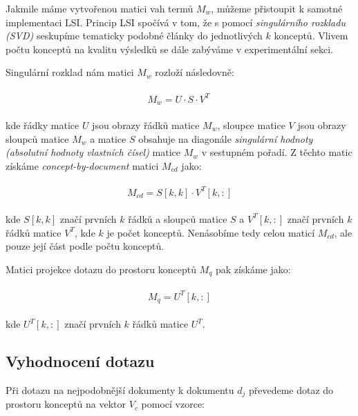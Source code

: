 \documentclass[11pt]{scrartcl} %
\begin{document}
Jakmile máme vytvořenou matici vah termů $M_w$, můžeme přistoupit k samotné implementaci LSI. Princip LSI spočívá v tom, že s pomocí \emph{singulárního rozkladu (SVD)} seskupíme tematicky podobné články do jednotlivých $k$ konceptů. Vlivem počtu konceptů na kvalitu výsledků se dále zabýváme v experimentální sekci.

\bigskip 

Singulární rozklad nám matici $M_w$ rozloží následovně:

\begin{align}
	\begin{split}
		M_w = U \cdot S \cdot V^T
	\end{split}					
\label{eq:svd}\
\end{align}

kde řádky matice $U$ jsou obrazy řádků matice $M_w$, sloupce matice $V$ jsou obrazy sloupců matice $M_w$ a matice $S$ obsahuje na diagonále \emph{singulární hodnoty (absolutní hodnoty vlastních čísel)} matice $M_w$ v sestupném pořadí. Z těchto matic získáme \emph{concept-by-document} matici $M_{cd}$ jako:

\begin{align}
	\begin{split}
		M_{cd} = S[k,k] \cdot V^T[k,:]
	\end{split}					
\end{align}

kde $S[k,k]$ značí prvních $k$ řádků a sloupců matice $S$ a $V^T[k,:]$ značí prvních $k$ řádků matice $V^T$, kde $k$ je počet konceptů. Nenásobíme tedy celou maticí $M_{cd}$, ale pouze její část podle počtu konceptů.

\bigskip

Matici projekce dotazu do prostoru konceptů $M_q$ pak získáme jako:

\begin{align}
	\begin{split}
		M_q = U^T[k,:]
	\end{split}					
\end{align}

kde $U^T[k,:]$ značí prvních $k$ řádků matice $U^T$.

\subsection{Vyhodnocení dotazu}

Při dotazu na nejpodobnější dokumenty k dokumentu $d_j$ převedeme dotaz do prostoru konceptů na vektor $V_c$ pomocí vzorce:
\end{document}

